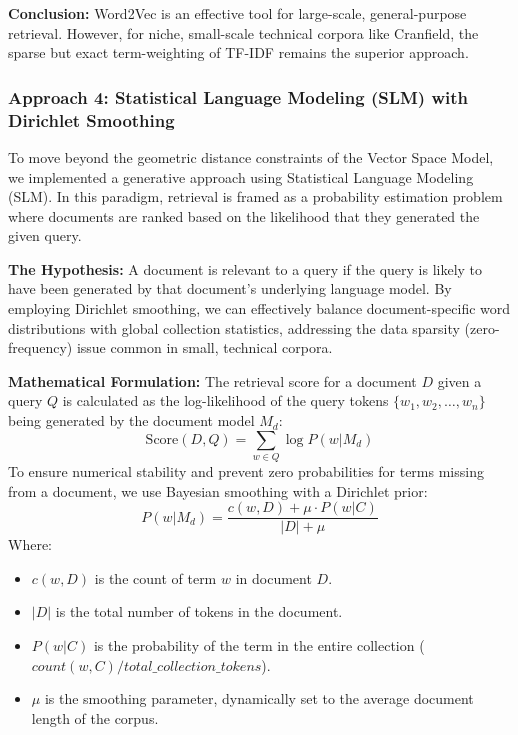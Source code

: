 \documentclass{article}
\begin{document}
\textbf{Conclusion:} Word2Vec is an effective tool for large-scale, general-purpose retrieval. However, for niche, small-scale technical corpora like Cranfield, the sparse but exact term-weighting of TF-IDF remains the superior approach.

\subsubsection{Approach 4: Statistical Language Modeling (SLM) with Dirichlet Smoothing}

To move beyond the geometric distance constraints of the Vector Space Model, we implemented a generative approach using Statistical Language Modeling (SLM). In this paradigm, retrieval is framed as a probability estimation problem where documents are ranked based on the likelihood that they generated the given query.

\textbf{The Hypothesis:} A document is relevant to a query if the query is likely to have been generated by that document's underlying language model. By employing Dirichlet smoothing, we can effectively balance document-specific word distributions with global collection statistics, addressing the data sparsity (zero-frequency) issue common in small, technical corpora.

\textbf{Mathematical Formulation:}
The retrieval score for a document $D$ given a query $Q$ is calculated as the log-likelihood of the query tokens $\{w_1, w_2, \dots, w_n\}$ being generated by the document model $M_d$:
\[ \text{Score}(D, Q) = \sum_{w \in Q} \log P(w | M_d) \]
To ensure numerical stability and prevent zero probabilities for terms missing from a document, we use Bayesian smoothing with a Dirichlet prior:
\[ P(w | M_d) = \frac{c(w, D) + \mu \cdot P(w | C)}{|D| + \mu} \]
Where:
\begin{itemize}
    \item $c(w, D)$ is the count of term $w$ in document $D$.
    \item $|D|$ is the total number of tokens in the document.
    \item $P(w | C)$ is the probability of the term in the entire collection ($count(w, C) / total\_collection\_tokens$).
    \item $\mu$ is the smoothing parameter, dynamically set to the average document length of the corpus.
\end{itemize}
\end{document}
